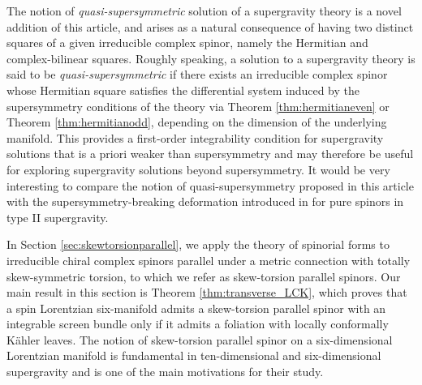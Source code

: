 \documentclass[10pt,a4paper,twoside,reqno]{amsart}
\theoremstyle{plain}
\theoremstyle{definition}
\theoremstyle{remark}
\begin{document}
The notion of \emph{quasi-supersymmetric} solution of a supergravity theory is a novel addition of this article, and arises as a natural consequence of having two distinct squares of a given irreducible complex spinor, namely the Hermitian and complex-bilinear squares. Roughly speaking, a solution to a supergravity theory is said to be \emph{quasi-supersymmetric} if there exists an irreducible complex spinor whose Hermitian square satisfies the differential system induced by the supersymmetry conditions of the theory via Theorem \ref{thm:hermitianeven} or Theorem \ref{thm:hermitianodd}, depending on the dimension of the underlying manifold. This provides a first-order integrability condition for supergravity solutions that is a priori weaker than supersymmetry and may therefore be useful for exploring supergravity solutions beyond supersymmetry. It would be very interesting to compare the notion of quasi-supersymmetry proposed in this article with the supersymmetry-breaking deformation introduced in \cite{Legramandi:2019ulq} for pure spinors in type II supergravity.\medskip

In Section \ref{sec:skewtorsionparallel}, we apply the theory of spinorial forms to irreducible chiral complex spinors parallel under a metric connection with totally skew-symmetric torsion, to which we refer as skew-torsion parallel spinors. Our main result in this section is Theorem \ref{thm:transverse_LCK}, which proves that a spin Lorentzian six-manifold admits a skew-torsion parallel spinor with an integrable screen bundle only if it admits a foliation with locally conformally Kähler leaves. The notion of skew-torsion parallel spinor on a six-dimensional Lorentzian manifold is fundamental in ten-dimensional and six-dimensional supergravity and is one of the main motivations for their study.\medskip
\end{document}
